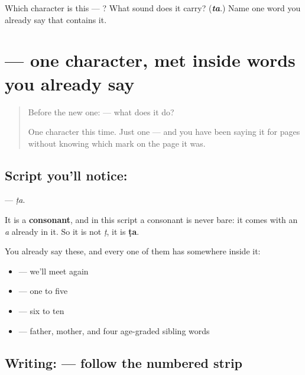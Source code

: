 \begin{tcolorbox}[breakable,colback=teal!4,colframe=teal!35!black,title={Before you move on}]
Which character is this — ? What sound does it carry? (\emph{\textbf{ta}}.) Name one word you already say that contains it.
\end{tcolorbox}
\section[\texorpdfstring{\ml{ട} (ṭa)}{ട (ṭa)}]{ — one character, met inside words you already say}

\label{lesson:ML-S117-letter-tta}



\begin{quote}
Before the new one:  — what does it do?

One character this time. Just one — and you have been saying it for pages without knowing which mark on the page it was.
\end{quote}

\subsection*{Script you'll notice: }
\textbf{} — \emph{ṭa}.

It is a \textbf{consonant}, and in this script a consonant is never bare: it comes with an \emph{a} already in it. So it is not \emph{ṭ}, it is \textbf{ṭa}.

You already say these, and every one of them has  somewhere inside it:

\begin{itemize}
\raggedright
  \item \textbf{ } — we'll meet again
  \item \textbf{    } — one to five
  \item \textbf{    } — six to ten
  \item \textbf{     } — father, mother, and four age-graded sibling words
\end{itemize}

\subsection*{Writing:  — follow the numbered strip}

